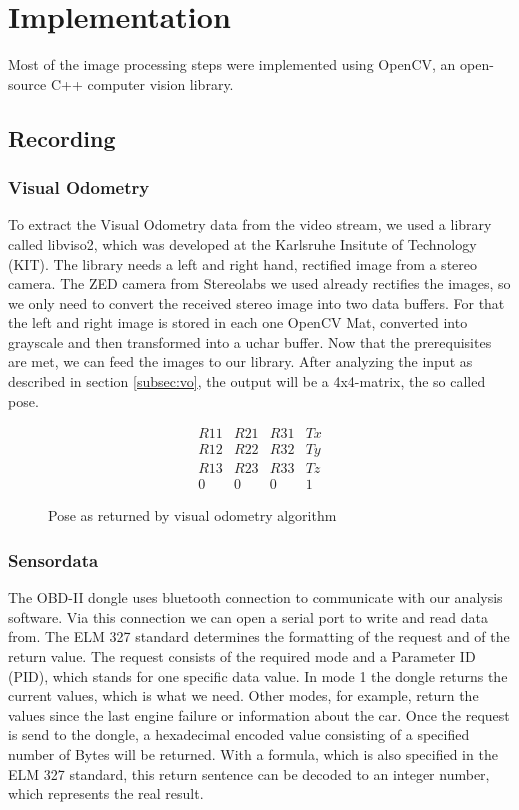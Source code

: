 \section{Implementation}
\label{sec:implementation}

Most of the image processing steps were implemented using OpenCV, an open-source C++ computer vision library. 

\subsection{Recording}
\subsubsection{Visual Odometry}
To extract the Visual Odometry data from the video stream, we used a library called libviso2, which was developed at the Karlsruhe Insitute of Technology (KIT). The library needs a left and right hand, rectified image from a stereo camera. The ZED camera from Stereolabs we used already rectifies the images, so we only need to convert the received stereo image into two data buffers.
For that the left and right image is stored in each one OpenCV Mat, converted into grayscale and then transformed into a uchar buffer.
Now that the prerequisites are met, we can feed the images to our library.
After analyzing the input as described in section \ref{subsec:vo}, the output will be a 4x4-matrix, the so called pose.
\begin{figure}
\[
 \begin{matrix}
  R11 & R21 & R31 & Tx \\
  R12 & R22 & R32 & Ty \\
  R13 & R23 & R33 & Tz \\
  0 & 0 & 0 & 1
 \end{matrix}
\]
\caption{Pose as returned by visual odometry algorithm}
\end{figure}

\subsubsection{Sensordata}
The OBD-II dongle uses bluetooth connection to communicate with our analysis software. Via this connection we can open a serial port to write and read data from.
The ELM 327 standard determines the formatting of the request and of the return value.
The request consists of the required mode and a Parameter ID (PID), which stands for one specific data value. In mode 1 the dongle returns the current values, which is what we need. Other modes, for example, return the values since the last engine failure or information about the car.
Once the request is send to the dongle, a hexadecimal encoded value consisting of a specified number of Bytes will be returned. With a formula, which is also specified in the ELM 327 standard, this return sentence can be decoded to an integer number, which represents the real result.

